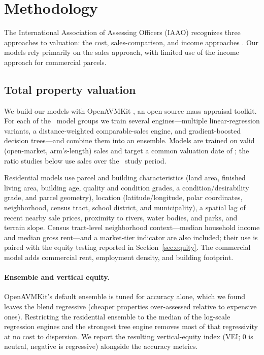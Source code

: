 \documentclass[11pt]{article}
\begin{document}
\section{Methodology}
The International Association of Assessing Officers (IAAO) recognizes three
approaches to valuation: the cost, sales-comparison, and income approaches
\citep{iaao_mass}. Our models rely primarily on the sales approach, with limited
use of the income approach for commercial parcels.

\subsection{Total property valuation}
We build our models with OpenAVMKit \citep{openavmkit}, an open-source
mass-appraisal toolkit. For each of the \numModelGroups\ model groups we train
several engines---multiple linear-regression variants, a distance-weighted
comparable-sales engine, and gradient-boosted decision trees---and combine them
into an ensemble. Models are trained on valid (open-market, arm's-length) sales
and target a common valuation date of \valuationDate; the ratio studies below
use sales over the \studyPeriod\ study period.

Residential models use parcel and building characteristics (land area, finished
living area, building age, quality and condition grades, a condition/desirability
grade, and parcel geometry), location (latitude/longitude, polar coordinates,
neighborhood, census tract, school district, and municipality), a spatial lag of
recent nearby sale prices, proximity to rivers, water bodies, and parks, and
terrain slope. Census tract-level neighborhood context---median household income
and median gross rent---and a market-tier indicator are also included; their use
is paired with the equity testing reported in Section~\ref{sec:equity}. The
commercial model adds commercial rent, employment density, and building
footprint.

\paragraph{Ensemble and vertical equity.}
OpenAVMKit's default ensemble is tuned for accuracy alone, which we found leaves
the blend regressive (cheaper properties over-assessed relative to expensive
ones). Restricting the residential ensemble to the median of the log-scale
regression engines and the strongest tree engine removes most of that
regressivity at no cost to dispersion. We report the resulting vertical-equity
index (VEI; 0 is neutral, negative is regressive) alongside the accuracy metrics.
\end{document}
